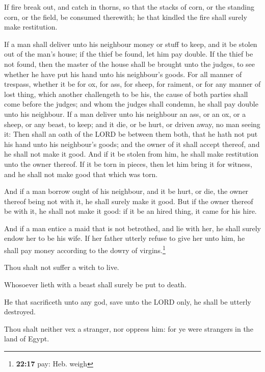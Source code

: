  If fire break out, and catch in thorns, so that the
stacks of corn, or the standing corn, or the field, be consumed
therewith; he that kindled the fire shall surely make restitution.

 If a man shall deliver unto his neighbour money or stuff
to keep, and it be stolen out of the man's house; if the thief be found,
let him pay double.  If the thief be not found, then the
master of the house shall be brought unto the judges, to see whether he
have put his hand unto his neighbour's goods.  For all
manner of trespass, whether it be for ox, for ass, for sheep, for
raiment, or for any manner of lost thing, which another challengeth to
be his, the cause of both parties shall come before the judges; and whom
the judges shall condemn, he shall pay double unto his neighbour.
 If a man deliver unto his neighbour an ass, or an ox, or
a sheep, or any beast, to keep; and it die, or be hurt, or driven away,
no man seeing it:  Then shall an oath of the LORD be
between them both, that he hath not put his hand unto his neighbour's
goods; and the owner of it shall accept thereof, and he shall not make
it good.  And if it be stolen from him, he shall make
restitution unto the owner thereof.  If it be torn in
pieces, then let him bring it for witness, and he shall not make good
that which was torn.

 And if a man borrow ought of his neighbour, and it be
hurt, or die, the owner thereof being not with it, he shall surely make
it good.  But if the owner thereof be with it, he shall
not make it good: if it be an hired thing, it came for his hire.

 And if a man entice a maid that is not betrothed, and
lie with her, he shall surely endow her to be his wife. 
If her father utterly refuse to give her unto him, he shall pay money
according to the dowry of virgins.\footnote{\textbf{22:17} pay: Heb.
  weigh}

 Thou shalt not suffer a witch to live.

 Whosoever lieth with a beast shall surely be put to
death.

 He that sacrificeth unto any god, save unto the LORD
only, he shall be utterly destroyed.

 Thou shalt neither vex a stranger, nor oppress him: for
ye were strangers in the land of Egypt.

